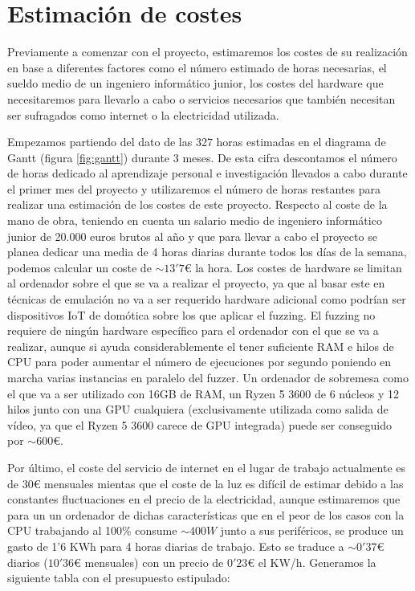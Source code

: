 \section{Estimación de costes}
Previamente a comenzar con el proyecto, estimaremos los costes de su realización en base a diferentes factores como el número estimado de horas necesarias, el sueldo medio de un ingeniero informático junior, los costes del hardware que necesitaremos para llevarlo a cabo o servicios necesarios
que también necesitan ser sufragados como internet o la electricidad utilizada.\bigskip

Empezamos partiendo del dato de las 327 horas estimadas en el diagrama de Gantt (figura \ref{fig:gantt}) durante 3 meses.
De esta cifra descontamos el número de horas dedicado al aprendizaje personal e investigación llevados a cabo durante el primer mes del
proyecto y utilizaremos el número de horas restantes para realizar una estimación de los costes de este proyecto. Respecto al coste de la 
mano de obra, teniendo en cuenta un 
salario medio de ingeniero informático junior de 20.000 euros brutos al año y que para llevar a cabo el proyecto se planea dedicar una media de 
4 horas diarias durante todos los días de la semana, podemos calcular un coste de $\sim13'7\euro$ la hora. Los costes de hardware se limitan al
ordenador sobre el que se va a realizar el proyecto, ya que al basar este en técnicas de emulación no va a ser requerido hardware adicional 
como podrían ser dispositivos IoT de domótica sobre los que aplicar el fuzzing. El fuzzing no requiere de ningún hardware específico para el 
ordenador con el que se va a realizar, aunque si ayuda considerablemente el tener suficiente RAM e hilos de CPU para poder aumentar el número de ejecuciones por segundo 
poniendo en marcha varias instancias en paralelo del fuzzer. Un ordenador de sobremesa como el que va a ser utilizado con 16GB de RAM, un 
Ryzen 5 3600 de 6 núcleos y 12 hilos junto con una GPU cualquiera (exclusivamente utilizada como salida de vídeo, ya que el Ryzen 5 3600 carece de GPU integrada) puede ser
conseguido por $\sim600\euro$.

Por último, el coste del servicio de internet en el lugar de trabajo actualmente es de $30\euro$ mensuales mientas 
que el coste de la luz es difícil de estimar debido a las constantes fluctuaciones en el precio de la electricidad, aunque estimaremos que 
para un un ordenador de dichas características que en el peor de los casos con la CPU trabajando al 100\% consume $\sim400W$ junto a sus 
periféricos, se produce un gasto de 1'6 KWh para 4 horas diarias de trabajo. Esto se traduce a $\sim0'37\euro$ diarios ($10'36\euro$ mensuales)
con un precio de $0'23\euro$ el KW/h. Generamos la siguiente tabla con el presupuesto estipulado:


